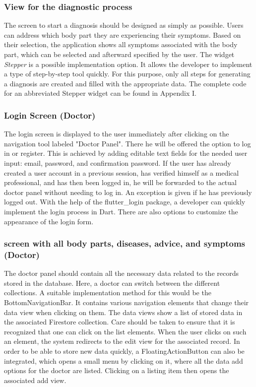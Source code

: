 \subsubsection{\textbf{View for the diagnostic process}}
The screen to start a diagnosis should be designed as simply as possible. Users can address which body part they are experiencing their symptoms. Based on their selection, the application shows all symptoms associated with the body part, which can be selected and afterward specified by the user. The widget \textit{Stepper} is a possible implementation option. It allows the developer to implement a type of step-by-step tool quickly. For this purpose, only all steps for generating a diagnosis are created and filled with the appropriate data. The complete code for an abbreviated Stepper widget can be found in Appendix I.

\subsubsection{\textbf{Login Screen (Doctor)}}
The login screen is displayed to the user immediately after clicking on the navigation tool labeled "Doctor Panel". There he will be offered the option to log in or register. This is achieved by adding editable text fields for the needed user input: email, password, and confirmation password. If the user has already created a user account in a previous session, has verified himself as a medical professional, and has then been logged in, he will be forwarded to the actual doctor panel without needing to log in. An exception is given if he has previously logged out. With the help of the flutter\_login package, a developer can quickly implement the login process in Dart. There are also options to customize the appearance of the login form.

\subsubsection{\textbf{screen with all body parts, diseases, advice, and symptoms (Doctor)}}
The doctor panel should contain all the necessary data related to the records stored in the database. Here, a doctor can switch between the different collections. A suitable implementation method for this would be the BottomNavigationBar. It contains various navigation elements that change their data view when clicking on them. The data views show a list of stored data in the associated Firestore collection. Care should be taken to ensure that it is recognized that one can click on the list elements. When the user clicks on such an element, the system redirects to the edit view for the associated record. In order to be able to store new data quickly, a FloatingActionButton can also be integrated, which opens a small menu by clicking on it, where all the data add options for the doctor are listed. Clicking on a listing item then opens the associated add view.


